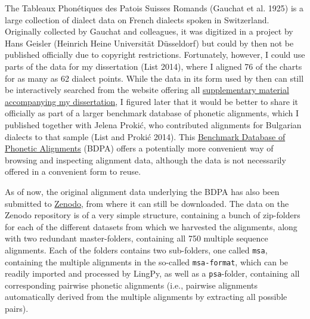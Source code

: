 \documentclass[
  a4paper,
  14pt,
  oneside,
  tablecaptionabove
]{scrbook}
\newcommand{\passthrough}[1]{#1}
\begin{document}
The Tableaux Phonétiques des Patois Suisses Romands (Gauchat et al.
1925) is a large collection of dialect data on French dialects spoken in
Switzerland. Originally collected by Gauchat and colleagues, it was
digitized in a project by Hans Geisler (Heinrich Heine Universität
Düsseldorf) but could by then not be published officially due to
copyright restrictions. Fortunately, however, I could use parts of the
data for my dissertation (List 2014), where I aligned 76 of the charts
for as many as 62 dialect points. While the data in its form used by
then can still be interactively searched from the website offering all
\href{https://sequencecomparison.github.io}{supplementary material
accompanying my dissertation}, I figured later that it would be better
to share it officially as part of a larger benchmark database of
phonetic alignments, which I published together with Jelena Prokić, who
contributed alignments for Bulgarian dialects to that sample (List and
Prokić 2014). This \href{http://alignments.lingpy.org}{Benchmark
Database of Phonetic Alignments} (BDPA) offers a potentially more
convenient way of browsing and inspecting alignment data, although the
data is not necessarily offered in a convenient form to reuse.

As of now, the original alignment data underlying the BDPA has also been
submitted to \href{https://zenodo.org/record/11880}{Zenodo}, from where
it can still be downloaded. The data on the Zenodo repository is of a
very simple structure, containing a bunch of zip-folders for each of the
different datasets from which we harvested the alignments, along with
two redundant master-folders, containing all 750 multiple sequence
alignments. Each of the folders contains two sub-folders, one called
\passthrough{\lstinline!msa!}, containing the multiple alignments in
the so-called \passthrough{\lstinline!msa-format!}, which can be
readily imported and processed by LingPy, as well as a
\passthrough{\lstinline!psa!}-folder, containing all corresponding
pairwise phonetic alignments (i.e., pairwise alignments automatically
derived from the multiple alignments by extracting all possible pairs).
\end{document}
